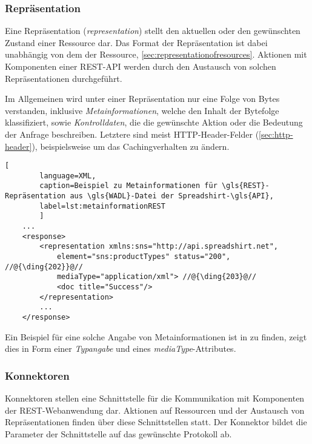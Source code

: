 \subsubsection{Repräsentation}
\label{sec:representation}

Eine Repräsentation (\emph{representation}) stellt den aktuellen oder den gewünschten Zustand einer Ressource dar. Das Format der Repräsentation ist dabei unabhängig von dem der Ressource, \cref{sec:representationofresources}.
Aktionen mit Komponenten einer \gls{REST}-\gls{API} werden durch den Austausch von solchen Repräsentationen durchgeführt.

Im Allgemeinen wird unter einer Repräsentation nur eine Folge von Bytes verstanden, inklusive \emph{Metainformationen}, welche den Inhalt der Bytefolge klassifiziert, sowie \emph{Kontrolldaten}, die die gewünschte Aktion oder die Bedeutung der Anfrage beschreiben. Letztere sind meist \gls{HTTP}-Header-Felder (\cref{sec:http-header}), beispielsweise um das Cachingverhalten zu ändern.

\begin{minipage}{\textwidth}
    \begin{lstlisting}[
        language=XML,
        caption=Beispiel zu Metainformationen für \gls{REST}-Repräsentation aus \gls{WADL}-Datei der Spreadshirt-\gls{API},
        label=lst:metainformationREST
        ]
    ...
    <response>
        <representation xmlns:sns="http://api.spreadshirt.net",
            element="sns:productTypes" status="200", //@{\ding{202}}@//
            mediaType="application/xml"> //@{\ding{203}@//
            <doc title="Success"/>
        </representation>
        ...
    </response>
    \end{lstlisting}
\end{minipage}

Ein Beispiel für eine solche Angabe von Metainformationen ist in  zu finden,  zeigt dies in Form einer \emph{Typangabe} und  eines \emph{mediaType}-Attributes.

\subsubsection{Konnektoren}

Konnektoren stellen eine Schnittstelle für die Kommunikation mit Komponenten der \gls{REST}-Webanwendung dar. Aktionen auf Ressourcen und der Austausch von Repräsentationen finden über diese Schnittstellen statt. Der Konnektor bildet die Parameter der Schnittstelle auf das gewünschte Protokoll ab.


